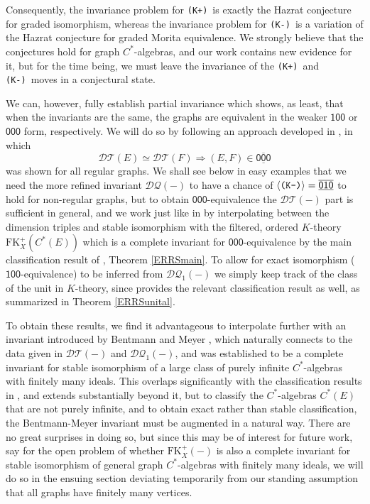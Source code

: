 \documentclass[12pt]{amsbook}%
\theoremstyle{defin}
\theoremstyle{remark}
\numberwithin{equation}{chapter}
\numberwithin{theor}{section}
\newcommand{\xyz}[1]{\mbox{$\mathsf{#1}$}}
\newcommand{\xyzrel}[1]{\mbox{$\overline{\underline{\mathsf{ #1}}}$}}
\newcommand{\KKKp}{\mbox{\texttt{\textup{(K+)}}}}
\newcommand{\KKKm}{\mbox{\texttt{\textup{(K-)}}}}
\newcommand{\DT}{\mathcal{DT}}
\newcommand{\DQ}{\mathcal{DQ}}
\newcommand{\DQp}{\mathcal{DQ}_1}
\begin{document}
Consequently, the invariance problem for \KKKp\
is exactly the Hazrat conjecture for
graded isomorphism, whereas the invariance
problem for \KKKm\ is a variation of
the Hazrat conjecture for graded Morita
equivalence.
We strongly believe that the conjectures
hold for graph $C^*$-algebras, and our work contains new
evidence for it, but for the time being, we must leave the invariance of the \KKKp\ and \KKKm\ moves
in a conjectural state.


We can, however, fully establish partial
invariance which shows, as least, that when the invariants are the same, the graphs are equivalent in the weaker \xyz{100} or \xyz{000} form, respectively.
We will do so by following an approach developed in \cite{parhhl:gkfkcga}, in which 
\[
\DT(E)\simeq \DT(F)\Longrightarrow (E,F)\in \xyzrel{000}
\]
was
shown for all  regular graphs. We shall see below in easy examples that we need the more refined invariant $\DQ(-)$ to have a chance of $\langle \KKKm\rangle=\xyzrel{010}$ to hold for non-regular graphs, but to obtain \xyz{000}-equivalence the $\DT(-)$ part is sufficient in general, and we work just like in  \cite{parhhl:gkfkcga} by interpolating between the dimension triples and stable isomorphism with the filtered, ordered $K$-theory $\mathrm{FK}_X^+ (C^*(E))$  which is a complete invariant for  \xyz{000}-equivalence by the main  classification result of \cite{segrerapws:ccuggs}, Theorem \ref{ERRSmain}. To allow for exact isomorphism (\xyz{100}-equivalence) to be inferred from $\DQp(-)$ we simply keep track of the class of the unit in $K$-theory, since \cite{segrerapws:ccuggs} provides the relevant classification result as well, as summarized in Theorem \ref{ERRSunital}. %


To obtain these results, we find it advantageous to interpolate further with
an invariant introduced by Bentmann and Meyer \cite{rbrm:mgmcek},
which naturally connects to the
data given in $\DT(-)$ and $\DQp(-)$,
and was established to be a complete invariant for stable isomorphism of a
large class of purely infinite $C^*$-algebras
with finitely many ideals. This overlaps
significantly with the classification
results in  \cite{segrerapws:ccuggs}, and extends
substantially beyond it, but to classify
the $C^*$-algebras $C^*(E)$ that are not
purely infinite, and to obtain exact
rather than stable classification, the
Bentmann-Meyer invariant must be augmented
in a natural way. There are no great surprises
in doing so, but since this may be of interest for future work, say for the open problem of whether $\mathrm{FK}^+_X(-)$ is also a complete invariant for stable isomorphism of general graph $C^*$-algebras with finitely many ideals, we will do so in the ensuing section deviating temporarily from our standing assumption that all graphs have finitely many vertices. 
\end{document}

